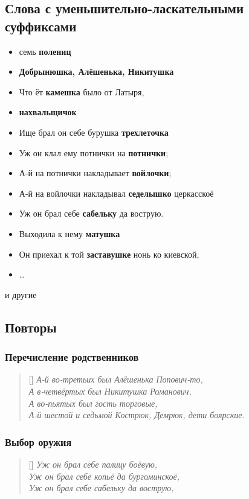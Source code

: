 \documentclass[a4paper, 12pt]{article}
\begin{document}
\subsection{Слова с уменьшительно-ласкательными суффиксами}
\begin{itemize}
    \item семь \textbf{полениц}
    \item \textbf{Добрынюшка, Алёшенька, Никитушка}
    \item Что ёт \textbf{камешка} было от Латыря,
    \item \textbf{нахвальщичок}
    \item Ище брал он себе бурушка \textbf{трехлеточка}
    \item Уж он клал ему потнички на \textbf{потнички};
    \item А-й на потнички накладывает \textbf{войлочки};
    \item А-й на войлочки накладывал \textbf{седелышко} церкасскоё
    \item Уж он брал себе \textbf{сабельку} да вострую.
    \item Выходила к нему \textbf{матушка}
    \item Он приехал к той \textbf{заставушке} нонь ко киевской,
    \item \ldots
\end{itemize}
и другие
\subsection{Повторы}
\subsubsection{Перечисление родственников}
\begin{verse}[\versewidth]
\itshape
А-й во-третьих был Алёшенька Попович-то,\\
А в-четвёртых был Никитушка Романович,\\
А во-пьятых был гость торговые,\\
А-й шестой и седьмой Кострюк, Демрюк, дети боярские.
\end{verse}

\subsubsection{Выбор оружия}
\begin{verse}[\versewidth]
\itshape
Уж он брал себе палицу боёвую,\\
Уж он брал себе копьё да бургоминскоё,\\
Уж он брал себе сабельку да вострую,\\
\end{verse}
\end{document}
